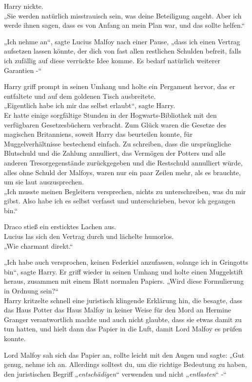 {Harry nickte.\\ „Sie werden natürlich misstrauisch sein, was deine Beteiligung angeht. Aber ich werde ihnen sagen, dass es von Anfang an mein Plan war, und das sollte helfen.“

„Ich nehme an“, sagte Lucius Malfoy nach einer Pause, „dass ich einen Vertrag aufsetzen lassen könnte, der dich von fast allen restlichen Schulden befreit, falls ich zufällig auf diese verrückte Idee komme. Es bedarf natürlich weiterer Garantien -“

Harry griff prompt in seinen Umhang und holte ein Pergament hervor, das er entfaltete und auf dem goldenen Tisch ausbreitete.\\ „Eigentlich habe ich mir das selbst erlaubt“, sagte Harry.\\ Er hatte einige sorgfältige Stunden in der Hogwarts-Bibliothek mit den verfügbaren Gesetzesbüchern verbracht. Zum Glück waren die Gesetze des magischen Britanniens, soweit Harry das beurteilen konnte, für Muggelverhältnisse bestechend einfach. Zu schreiben, dass die ursprüngliche Blutschuld und die Zahlung annulliert, das Vermögen der Potters und alle anderen Tresorgegenstände zurückgegeben und die Restschuld annulliert würde, alles ohne Schuld der Malfoys, waren nur ein paar Zeilen mehr, als es brauchte, um sie laut auszusprechen.\\ „Ich musste meinen Begleitern versprechen, nichts zu unterschreiben, was du mir gibst. Also habe ich es selbst verfasst und unterschrieben, bevor ich gegangen bin.“

Draco stieß ein ersticktes Lachen aus.\\ Lucius las sich den Vertrag durch und lächelte humorlos.\\ „Wie charmant direkt.“

„Ich habe auch versprochen, keinen Federkiel anzufassen, solange ich in Gringotts bin“, sagte Harry. Er griff wieder in seinen Umhang und holte einen Muggelstift heraus, zusammen mit einem Blatt normalen Papiers. „Wird diese Formulierung in Ordnung sein?“\\ Harry kritzelte schnell eine juristisch klingende Erklärung hin, die besagte, dass das Haus Potter das Haus Malfoy in keiner Weise für den Mord an Hermine Granger verantwortlich machte und auch nicht glaubte, dass sie etwas damit zu tun hatten, und hielt dann das Papier in die Luft, damit Lord Malfoy es prüfen konnte.

Lord Malfoy sah sich das Papier an, rollte leicht mit den Augen und sagte: „Gut genug, nehme ich an. Allerdings solltest du, um die richtige Bedeutung zu haben, den juristischen Begriff „\emph{entschädigen}“ verwenden und nicht „\emph{entlasten}“ -“

}
